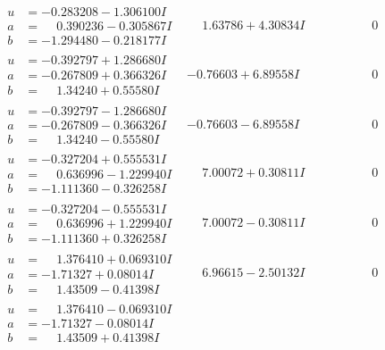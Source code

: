\documentclass[1p]{elsarticle_modified}
\theoremstyle{definition}
\begin{document}
$$\begin{array}{c|c|c}
\begin{aligned}
u &= -0.283208 - 1.306100 I \\
a &= \phantom{-}0.390236 - 0.305867 I \\
b &= -1.294480 - 0.218177 I\end{aligned}
 & \phantom{-}1.63786 + 4.30834 I & \phantom{-0.000000 } 0 \\ \hline\begin{aligned}
u &= -0.392797 + 1.286680 I \\
a &= -0.267809 + 0.366326 I \\
b &= \phantom{-}1.34240 + 0.55580 I\end{aligned}
 & -0.76603 + 6.89558 I & \phantom{-0.000000 } 0 \\ \hline\begin{aligned}
u &= -0.392797 - 1.286680 I \\
a &= -0.267809 - 0.366326 I \\
b &= \phantom{-}1.34240 - 0.55580 I\end{aligned}
 & -0.76603 - 6.89558 I & \phantom{-0.000000 } 0 \\ \hline\begin{aligned}
u &= -0.327204 + 0.555531 I \\
a &= \phantom{-}0.636996 - 1.229940 I \\
b &= -1.111360 - 0.326258 I\end{aligned}
 & \phantom{-}7.00072 + 0.30811 I & \phantom{-0.000000 } 0 \\ \hline\begin{aligned}
u &= -0.327204 - 0.555531 I \\
a &= \phantom{-}0.636996 + 1.229940 I \\
b &= -1.111360 + 0.326258 I\end{aligned}
 & \phantom{-}7.00072 - 0.30811 I & \phantom{-0.000000 } 0 \\ \hline\begin{aligned}
u &= \phantom{-}1.376410 + 0.069310 I \\
a &= -1.71327 + 0.08014 I \\
b &= \phantom{-}1.43509 - 0.41398 I\end{aligned}
 & \phantom{-}6.96615 - 2.50132 I & \phantom{-0.000000 } 0 \\ \hline\begin{aligned}
u &= \phantom{-}1.376410 - 0.069310 I \\
a &= -1.71327 - 0.08014 I \\
b &= \phantom{-}1.43509 + 0.41398 I\end{aligned}

\end{array}$$
\end{document}
